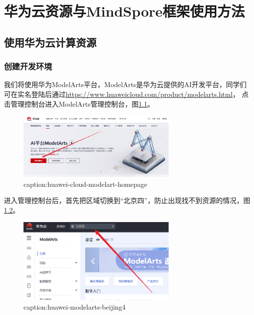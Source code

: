 \chapter{华为云资源与MindSpore框架使用方法}

\section{使用华为云计算资源}\label{sec:huawei-cloud-usage}

\subsection{创建开发环境}

我们将使用华为ModelArts平台，ModelArts是华为云提供的AI开发平台，同学们可在实名登陆后通过\url{https://www.huaweicloud.com/product/modelarts.html}， 点击管理控制台进入ModelArts管理控制台，图\ref{fig:huawei-cloud-modelart-homepage}。
\begin{figure}[htbp]
	\centering
	\includegraphics[width=0.7\textwidth]{figures/huawei-cloud-modelart-homepage.png}
	\caption{caption:huawei-cloud-modelart-homepage}
	\label{fig:huawei-cloud-modelart-homepage}
\end{figure}

进入管理控制台后，首先把区域切换到“北京四”，防止出现找不到资源的情况，图\ref{fig:huawei-modelarts-beijing4}。
\begin{figure}[htbp]
	\centering
	\includegraphics[width=0.7\textwidth]{figures/huawei-modelarts-beijing4.png}
	\caption{caption:huawei-modelarts-beijing4}
	\label{fig:huawei-modelarts-beijing4}
\end{figure}

